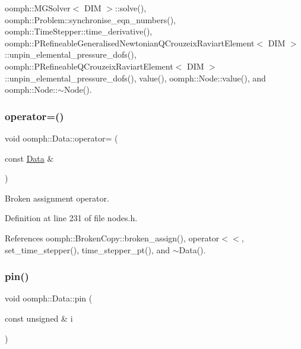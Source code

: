 oomph\+::\+M\+G\+Solver$<$ D\+I\+M $>$\+::solve(), oomph\+::\+Problem\+::synchronise\+\_\+eqn\+\_\+numbers(), oomph\+::\+Time\+Stepper\+::time\+\_\+derivative(), oomph\+::\+P\+Refineable\+Generalised\+Newtonian\+Q\+Crouzeix\+Raviart\+Element$<$ D\+I\+M $>$\+::unpin\+\_\+elemental\+\_\+pressure\+\_\+dofs(), oomph\+::\+P\+Refineable\+Q\+Crouzeix\+Raviart\+Element$<$ D\+I\+M $>$\+::unpin\+\_\+elemental\+\_\+pressure\+\_\+dofs(), value(), oomph\+::\+Node\+::value(), and oomph\+::\+Node\+::$\sim$\+Node().

\mbox{\label{classoomph_1_1Data_ae68161e2bb30db0938b09db2f8fb4c9d}} 
\subsubsection{\texorpdfstring{operator=()}{operator=()}}
{\footnotesize\ttfamily void oomph\+::\+Data\+::operator= (\begin{DoxyParamCaption}\item[{const \hyperlink{classoomph_1_1Data}{Data} \&}]{ }\end{DoxyParamCaption})\hspace{0.3cm}{\ttfamily [inline]}}



Broken assignment operator. 



Definition at line 231 of file nodes.\+h.



References oomph\+::\+Broken\+Copy\+::broken\+\_\+assign(), operator$<$$<$, set\+\_\+time\+\_\+stepper(), time\+\_\+stepper\+\_\+pt(), and $\sim$\+Data().

\mbox{\label{classoomph_1_1Data_a422231c58e423f0b43822827aa334d79}} 
\subsubsection{\texorpdfstring{pin()}{pin()}}
{\footnotesize\ttfamily void oomph\+::\+Data\+::pin (\begin{DoxyParamCaption}\item[{const unsigned \&}]{i }\end{DoxyParamCaption})\hspace{0.3cm}{\ttfamily [inline]}}



